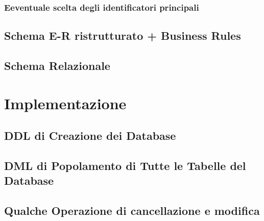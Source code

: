 \documentclass[letterpaper]{report}
\begin{document}
\subsection{Eeventuale scelta degli identificatori principali}
\section{Schema E-R ristrutturato + Business Rules}
\section{Schema Relazionale}

\chapter{Implementazione}
\section{DDL di Creazione dei Database}
\section{DML di Popolamento di Tutte le Tabelle del Database}
\section{Qualche Operazione di cancellazione e modifica}
\end{document}
